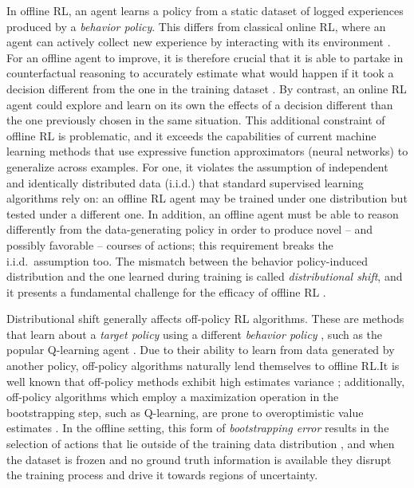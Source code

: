 In offline RL, an agent learns a policy from a static dataset of
logged experiences produced by a \textit{behavior policy}.
This differs from classical online RL, where an agent can actively
collect new experience by interacting with its environment
\citep{sutton2018reinforcement}. For an offline agent to
improve, it is therefore crucial that it is able to partake in
counterfactual
reasoning to accurately estimate what would happen if it took a
decision different from the one in the training dataset
\citep{levine2020offline}. By contrast, an online RL agent could
explore and learn on its own the effects of a decision
different than the one previously chosen in the same situation. This
additional constraint of offline RL is
problematic, and it exceeds the capabilities of current machine learning
methods that use expressive function approximators (neural networks)
to generalize across examples. For one, it violates the assumption of
independent and
identically distributed data (i.i.d.) that standard supervised
learning algorithms rely on: an offline RL agent may be trained under
one distribution but tested under a different one.
In addition, an offline agent must be able to reason differently from
the data-generating policy in order to produce novel -- and possibly
favorable -- courses of actions; this requirement breaks the i.i.d.\
assumption too.
The mismatch between the behavior policy-induced distribution and the
one learned during training is called \textit{distributional shift},
and it presents a fundamental challenge for the efficacy of offline RL
\citep{levine2020offline}.

Distributional shift generally affects off-policy RL algorithms. These
are methods that learn about a \textit{target policy} using a
different \textit{behavior policy} \citep{sutton2018reinforcement},
such as the popular Q-learning agent \citep{watkins1992q}. Due to
their ability to learn from data generated by another policy,
off-policy algorithms naturally lend themselves to offline RL.\@ It is
well known that off-policy methods exhibit high estimates variance
\citep{sutton2018reinforcement}; additionally,
off-policy algorithms which employ a maximization operation in the
bootstrapping step, such as Q-learning,
are prone to overoptimistic value estimates
\citep{thrun1993issues}. In the offline setting, this form of
\textit{bootstrapping error} results in the selection of actions that
lie outside of the training data distribution
\citep{kumar2019stabilizing}, and when the dataset is frozen and no
ground truth information is available they
disrupt the training process and drive it towards regions of
uncertainty.

